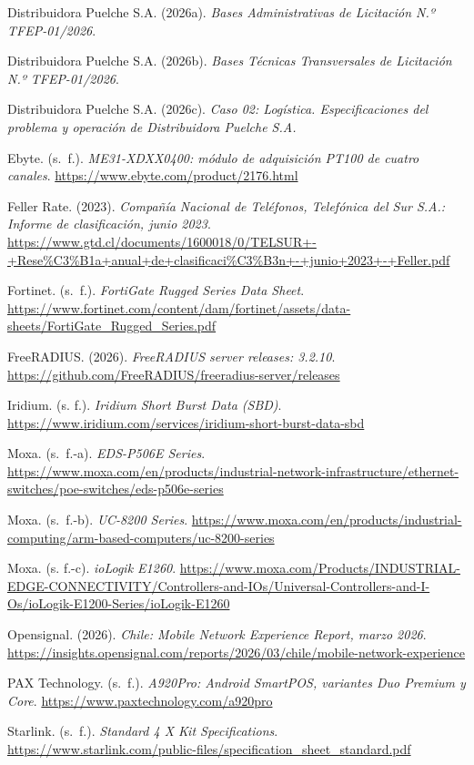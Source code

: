 \begin{list}{}{\setlength{\leftmargin}{1.27cm}\setlength{\itemindent}{-1.27cm}\setlength{\itemsep}{0.5\baselineskip}\raggedright}
\item Distribuidora Puelche S.A. (2026a). \textit{Bases Administrativas de Licitación N.º TFEP-01/2026}.
\item Distribuidora Puelche S.A. (2026b). \textit{Bases Técnicas Transversales de Licitación N.º TFEP-01/2026}.
\item Distribuidora Puelche S.A. (2026c). \textit{Caso 02: Logística. Especificaciones del problema y operación de Distribuidora Puelche S.A.}
\item Ebyte. (s.~f.). \textit{ME31-XDXX0400: módulo de adquisición PT100 de cuatro canales}. \url{https://www.ebyte.com/product/2176.html}
\item Feller Rate. (2023). \textit{Compañía Nacional de Teléfonos, Telefónica del Sur S.A.: Informe de clasificación, junio 2023}. \url{https://www.gtd.cl/documents/1600018/0/TELSUR+-+Rese%C3%B1a+anual+de+clasificaci%C3%B3n+-+junio+2023+-+Feller.pdf}
\item Fortinet. (s.~f.). \textit{FortiGate Rugged Series Data Sheet}. \url{https://www.fortinet.com/content/dam/fortinet/assets/data-sheets/FortiGate_Rugged_Series.pdf}
\item FreeRADIUS. (2026). \textit{FreeRADIUS server releases: 3.2.10}. \url{https://github.com/FreeRADIUS/freeradius-server/releases}
\item Iridium. (s. f.). \textit{Iridium Short Burst Data (SBD)}. \url{https://www.iridium.com/services/iridium-short-burst-data-sbd}
\item Moxa. (s.~f.-a). \textit{EDS-P506E Series}. \url{https://www.moxa.com/en/products/industrial-network-infrastructure/ethernet-switches/poe-switches/eds-p506e-series}
\item Moxa. (s.~f.-b). \textit{UC-8200 Series}. \url{https://www.moxa.com/en/products/industrial-computing/arm-based-computers/uc-8200-series}
\item Moxa. (s. f.-c). \textit{ioLogik E1260}. \url{https://www.moxa.com/Products/INDUSTRIAL-EDGE-CONNECTIVITY/Controllers-and-IOs/Universal-Controllers-and-I-Os/ioLogik-E1200-Series/ioLogik-E1260}
\item Opensignal. (2026). \textit{Chile: Mobile Network Experience Report, marzo 2026}. \url{https://insights.opensignal.com/reports/2026/03/chile/mobile-network-experience}
\item PAX Technology. (s.~f.). \textit{A920Pro: Android SmartPOS, variantes Duo Premium y Core}. \url{https://www.paxtechnology.com/a920pro}
\item Starlink. (s.~f.). \textit{Standard 4 X Kit Specifications}. \url{https://www.starlink.com/public-files/specification_sheet_standard.pdf}

\end{list}
